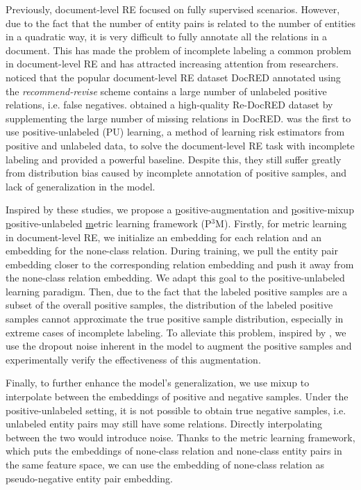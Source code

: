 \documentclass[11pt]{article}
\begin{document}
Previously, document-level RE focused on fully supervised scenarios. However, due to the fact that the number of entity pairs is related to the number of entities in a quadratic way, it is very difficult to fully annotate all the relations in a document. This has made the problem of incomplete labeling a common problem in document-level RE and has attracted increasing attention from researchers. \citep{huang-etal-2022-recommend} noticed that the popular document-level RE dataset DocRED \citep{yao-etal-2019-docred} annotated using the \emph{recommend-revise} scheme contains a large number of unlabeled positive relations, i.e. false negatives. \citep{tan-etal-2022-revisiting} obtained a high-quality Re-DocRED dataset by supplementing the large number of missing relations in DocRED. \citep{wang2022unified} was the first to use positive-unlabeled (PU) learning, a method of learning risk estimators from positive and unlabeled data, to solve the document-level RE task with incomplete labeling and provided a powerful baseline. Despite this, they still suffer greatly from distribution bias caused by incomplete annotation of positive samples, and lack of generalization in the model.

Inspired by these studies, we propose a \underline{p}ositive-augmentation and \underline{p}ositive-mixup \underline{p}ositive-unlabeled \underline{m}etric learning framework (P$^{3}$M). Firstly, for metric learning in document-level RE, we initialize an embedding for each relation and an embedding for the none-class relation. During training, we pull the entity pair embedding closer to the corresponding relation embedding and push it away from the none-class relation embedding. We adapt this goal to the positive-unlabeled learning paradigm. Then, due to the fact that the labeled positive samples are a subset of the overall positive samples, the distribution of the labeled positive samples cannot approximate the true positive sample distribution, especially in extreme cases of incomplete labeling. To alleviate this problem, inspired by \citep{gao-etal-2021-simcse}, we use the dropout noise \citep{srivastava2014dropout} inherent in the model to augment the positive samples and experimentally verify the effectiveness of this augmentation.

Finally, to further enhance the model's generalization, we use mixup to interpolate between the embeddings of positive and negative samples. Under the positive-unlabeled setting, it is not possible to obtain true negative samples, i.e. unlabeled entity pairs may still have some relations. Directly interpolating between the two would introduce noise. Thanks to the metric learning framework, which puts the embeddings of none-class relation and none-class entity pairs in the same feature space, we can use the embedding of none-class relation as pseudo-negative entity pair embedding.
\end{document}
